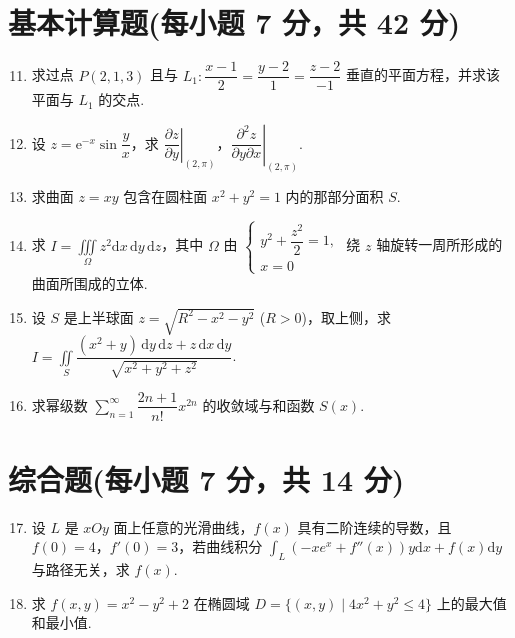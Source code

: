 \documentclass[../main.tex]{subfiles}
\begin{document}
\section{基本计算题(每小题 7 分，共 42 分)}
\begin{enumerate}
  \setcounter{enumi}{10}
  \item 求过点 \( P(2,1,3) \) 且与 \( L_1: \dfrac{x-1}{2} = \dfrac{y-2}{1} = \dfrac{z-2}{-1} \) 垂直的平面方程，并求该平面与 \( L_1 \) 的交点.
        \vspace{9em}

  \item 设 \( z = \mathrm{e}^{-x} \sin \dfrac{y}{x} \)，求 \( \left. \dfrac{\partial z}{\partial y} \right|_{(2,\pi)} \)，\( \left. \dfrac{\partial^2 z}{\partial y \partial x} \right|_{(2,\pi)} \).
        \vspace{9em}

  \item 求曲面 \( z = xy \) 包含在圆柱面 \( x^2 + y^2 = 1 \) 内的那部分面积 \( S \).
        \vspace{9em}
  \item 求 \( I = \displaystyle \iiint \limits_{\Omega} z^2 \mathrm{d}x\,\mathrm{d}y\,\mathrm{d}z \)，其中 \( \Omega \) 由 \( \begin{cases} y^2 + \dfrac{z^2}{2} = 1, \\ x = 0 \end{cases} \) 绕 \( z \) 轴旋转一周所形成的曲面所围成的立体.
        \vspace{9em}

  \item 设 \( S \) 是上半球面 \( z = \sqrt{R^2 - x^2 - y^2} \) (\( R > 0 \))，取上侧，求 \( I = \displaystyle \iint \limits_S \dfrac{(x^2 + y) \,\mathrm{d}y\,\mathrm{d}z + z \,\mathrm{d}x\,\mathrm{d}y}{\sqrt{x^2 + y^2 + z^2}} \).
        \vspace{9em}

  \item 求幂级数 \( \sum \limits_{n=1}^{\infty} \dfrac{2n + 1}{n!} x^{2n} \) 的收敛域与和函数 \( S(x) \).
        \vspace{9em}
\end{enumerate}

\section{综合题(每小题 7 分，共 14 分)}

\begin{enumerate}
  \setcounter{enumi}{16}
  \item 设 \( L \) 是 \( xOy \) 面上任意的光滑曲线，\( f(x) \) 具有二阶连续的导数，且 \( f(0) = 4 \)，\( f'(0) = 3 \)，若曲线积分 \( \displaystyle\int_L (-xe^{x} + f''(x))y \mathrm{d}x + f(x) \mathrm{d}y \) 与路径无关，求 \( f(x) \).
        \vspace{11em}

  \item 求 \( f(x, y) = x^2 - y^2 + 2 \) 在椭圆域 \( D = \{(x, y) \mid 4x^2 + y^2 \leq 4\} \) 上的最大值和最小值.
        \vspace{11em}
\end{enumerate}
\end{document}
